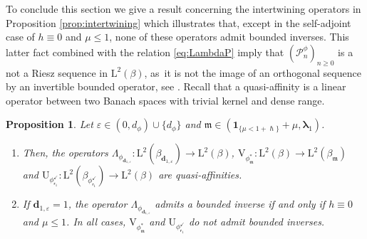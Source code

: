 \documentclass[10pt]{amsart}
\let\epsilon\varepsilon
\theoremstyle{plain}
\newtheorem{proposition}[theorem]{Proposition}
\theoremstyle{definition}
\renewcommand{\P}{\mathcal{P}}
\newcommand{\Leb}{\mathrm{L}}
\newcommand{\m}{\mathfrak{m}}
\newcommand{\dz}{{\bm{d}}_{1,\epsilon}}
\newcommand{\lam}{{\bm{\lambda}_1}}
\newcommand{\vat}{{\mathsf{r}_1}}
\newcommand{\phm}{{\phi_\m^*}}
\renewcommand{\varphi}{{\phi_{\vat}^{\checkmark}}}
\newcommand{\gab}[1][\lam,\mo]{{\beta_{#1}}}
\let\h\hslash
\let\mo\mu
\let\bpsi\beta
\begin{document}
To conclude this section we give a result concerning the intertwining operators in Proposition \ref{prop:intertwining} which illustrates that, except in the self-adjoint case of $h \equiv 0$ and $\mo \leq 1$, none of these operators admit bounded inverses. This latter fact combined with the relation \eqref{eq:LambdaP} imply that $(\P_n^\phi)_{n\geq0}$ is a not a Riesz sequence in $\Leb^2(\bpsi)$, as~it is not the image of an orthogonal sequence by an invertible bounded operator, see \cite{Christensen2003a}. Recall that a quasi-affinity is a linear operator between two Banach spaces with trivial kernel and dense range.

\begin{proposition}
\label{prop:quasi-similar}
Let $\epsilon \in (0,d_\phi) \cup \{d_\phi\}$ and $\m \in (\bm{1}_{\{\mo < 1+\h\}} + \mo ,\lam)$.
\begin{enumerate}
\item \label{item-1:prop:quasi-similar} Then, the operators $\Lambda_{\phi_{\dz}}:\Leb^2(\gab[\dz]) \to \Leb^2(\bpsi)$, $\mathrm{V}_{\phm}:\Leb^2(\bpsi)\to\Leb^2(\gab[\m])$ and $\mathrm{U}_\varphi:\Leb^2(\bpsi_\varphi) \to \Leb^2(\bpsi)$ are quasi-affinities.
\item \label{item-2:prop:quasi-similar}
If $\dz = 1$, the operator $\Lambda_{\phi_{\dz}}$ admits a bounded inverse if and only if $h \equiv 0$ and $\mo \leq 1$. In all cases, $\mathrm{V}_{\phm}$ and $\mathrm{U}_\varphi$ do not admit bounded inverses.
\end{enumerate}
\end{proposition}
\end{document}
